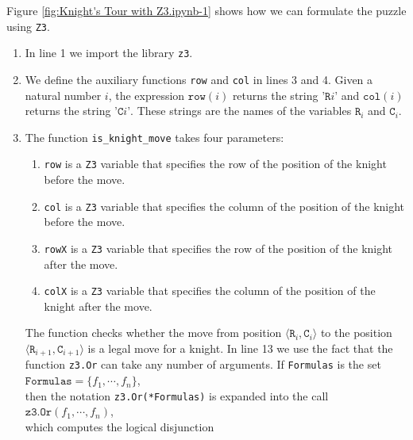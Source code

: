 Figure \ref{fig:Knight's Tour with Z3.ipynb-1} shows how we can formulate the puzzle using \texttt{Z3}.
\begin{enumerate}
\item In line 1 we import the library \texttt{z3}.
 
\item We define the auxiliary functions \texttt{row} and \texttt{col} in lines 3 and 4.
      Given a natural number $i$, the expression $\mathtt{row}(i)$ returns the string $\texttt{'R}i\texttt{'}$
      and  $\mathtt{col}(i)$ returns the string  $\texttt{'C}i\texttt{'}$.  These strings are the names of the
      variables $\mathtt{R}_i$ and $\mathtt{C}_i$.
\item The function \texttt{is\_knight\_move} takes four parameters:
      \begin{enumerate}
      \item \texttt{row} is a \texttt{Z3} variable that specifies the row of the position of the knight before
            the move. 
      \item \texttt{col} is a \texttt{Z3} variable that specifies the column of the position of the knight
            before the move. 
      \item \texttt{rowX} is a \texttt{Z3} variable that specifies the row of the position of the knight after
            the move. 
      \item \texttt{colX} is a \texttt{Z3} variable that specifies the column of the position of the knight
            after the move. 
      \end{enumerate}
      The function checks whether the move from position 
      $\langle \mathtt{R}_i, \mathtt{C}_i \rangle$ to the position $\langle \mathtt{R}_{i+1}, \mathtt{C}_{i+1} \rangle$
      is a legal move for a knight.  In line 13 we use the fact that the function \texttt{z3.Or}
      can take any number of arguments.  If \texttt{Formulas} is the set 
      \\[0.2cm]
      \hspace*{1.3cm}
      $\texttt{Formulas} = \{f_1, \cdots, f_n\}$,
      \\[0.2cm]
      then the notation \texttt{z3.Or(*Formulas)} is expanded into the call
      \\[0.2cm]
      \hspace*{1.3cm}
      $\texttt{z3.Or}(f_1, \cdots, f_n)$,
      \\[0.2cm]
      which computes the logical disjunction
      \\[0.2cm]
      \hspace*{1.3cm}

\end{enumerate}
